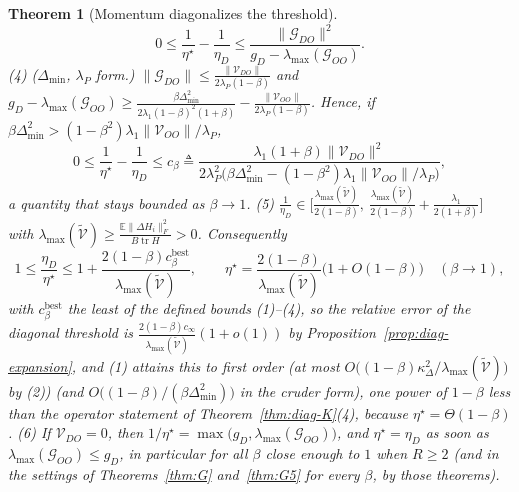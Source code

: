 \documentclass[11pt]{article}
\newtheorem{theorem}{Theorem}
\theoremstyle{remark}
\newcommand{\E}{\mathbb{E}}
\newcommand{\tr}{\operatorname{tr}}
\begin{document}
\begin{theorem}[Momentum diagonalizes the threshold]
\[0\le\frac1{\eta^\star}-\frac1{\eta_D}\le\frac{\|\mathcal G_{DO}\|^2}{g_D-\lambda_{\max}(\mathcal G_{OO})} .
\]
(4) ($\Delta_{\min}$, $\lambda_P$ form.) $\|\mathcal G_{DO}\|\le\frac{\|\mathcal V_{DO}\|}{2\lambda_P(1-\beta)}$ and $g_D-\lambda_{\max}(\mathcal G_{OO})\ge\frac{\beta\Delta_{\min}^2}{2\lambda_1(1-\beta)^2(1+\beta)}-\frac{\|\mathcal V_{OO}\|}{2\lambda_P(1-\beta)}$. Hence, if $\beta\Delta_{\min}^2>(1-\beta^2)\lambda_1\|\mathcal V_{OO}\|/\lambda_P$,
\[
0\le\frac1{\eta^\star}-\frac1{\eta_D}\le c_\beta\triangleq\frac{\lambda_1(1+\beta)\|\mathcal V_{DO}\|^2}{2\lambda_P^2\big(\beta\Delta_{\min}^2-(1-\beta^2)\lambda_1\|\mathcal V_{OO}\|/\lambda_P\big)},
\]
a quantity that stays bounded as $\beta\to1$.
(5) $\frac1{\eta_D}\in\Big[\frac{\lambda_{\max}(\widetilde{\mathcal V})}{2(1-\beta)},\ \frac{\lambda_{\max}(\widetilde{\mathcal V})}{2(1-\beta)}+\frac{\lambda_1}{2(1+\beta)}\Big]$ with $\lambda_{\max}(\widetilde{\mathcal V})\ge\frac{\E\|\Delta H_i\|_F^2}{B\tr H}>0$. Consequently
\[
1\le\frac{\eta_D}{\eta^\star}\le1+\frac{2(1-\beta)c^{\mathrm{best}}_\beta}{\lambda_{\max}(\widetilde{\mathcal V})},\qquad
\eta^\star=\frac{2(1-\beta)}{\lambda_{\max}(\widetilde{\mathcal V})}\big(1+O(1-\beta)\big)\quad(\beta\to1),
\]
with $c^{\mathrm{best}}_\beta$ the least of the defined bounds (1)--(4), so the relative error of the diagonal threshold is $\frac{2(1-\beta)c_\infty}{\lambda_{\max}(\widetilde{\mathcal V})}(1+o(1))$ by Proposition~\ref{prop:diag-expansion}, and (1) attains this to first order (at most $O\big((1-\beta)\kappa_\Delta^2/\lambda_{\max}(\widetilde{\mathcal V})\big)$ by (2)) (and $O\big((1-\beta)/(\beta\Delta_{\min}^2)\big)$ in the cruder form), one power of $1-\beta$ less than the operator statement of Theorem~\ref{thm:diag-K}(4), because $\eta^\star=\Theta(1-\beta)$.
(6) If $\mathcal V_{DO}=0$, then $1/\eta^\star=\max\big(g_D,\lambda_{\max}(\mathcal G_{OO})\big)$, and $\eta^\star=\eta_D$ as soon as $\lambda_{\max}(\mathcal G_{OO})\le g_D$, in particular for all $\beta$ close enough to $1$ when $R\ge2$ (and in the settings of Theorems~\ref{thm:G} and~\ref{thm:G5} for every $\beta$, by those theorems).
\end{theorem}
\end{document}
